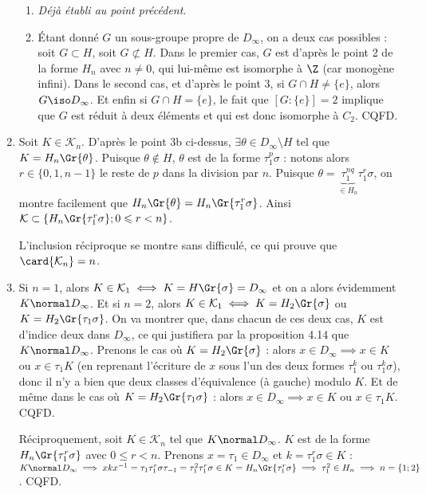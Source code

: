 \begin{enumerate}[1)]
\begin{enumerate}
    \item \emph{Déjà établi au point précédent}.
    \item Étant donné $G$ un sous-groupe propre de $D_{\infty}$, on a deux cas possibles : soit $G\subset H$, soit $G\not\subset H$. Dans le premier cas, $G$ est d'après le point 2 de la forme $H_n$ avec $n\neq 0$, qui lui-même est isomorphe à $\Z$ (car monogène infini).
    Dans le second cas, et d'après le point 3, si $G\cap H \neq \{e\}$, alors $G \iso D_{\infty}$. Et enfin si $G\cap H =\{e\}$, le fait que $[G:\{e\}] = 2$ implique que $G$ est réduit à deux éléments et qui est donc isomorphe à $C_2$. CQFD.
\end{enumerate}
\item Soit $K\in \mathcal{K}_n$. D'après le point 3b ci-dessus, $\exists \theta \in D_{\infty}\setminus H$ tel que $K = H_n \Gr{\theta}$. Puisque $\theta \not\in H$, $\theta$ est de la forme $\tau_1^p \sigma$ :
 notons alors $r\in \{0,1,n-1\}$ le reste de $p$ dans la division par $n$. Puisque $\theta = \underbrace{\tau_1^{nq}}_{\in H_n} \tau_1^r \sigma$, on montre facilement que $H_n \Gr{\theta} = H_n \Gr{\tau_1^r \sigma}$. Ainsi 
 $\mathcal{K}\subset \left\{H_n \Gr{\tau_1^r \sigma}; 0\leqslant r< n \right\}$.

 L'inclusion réciproque se montre sans difficulé, ce qui prouve que $\card{\mathcal{K}_n} = n$. 

\item Si $n=1$, alors $K\in \mathcal{K}_1\iff K = H\Gr{\sigma} = D_{\infty}$ et on a alors évidemment $K\normal D_{\infty}$. Et si $n=2$, alors $K\in \mathcal{K}_1\iff K = H_2\Gr{\sigma}$ ou 
$K = H_2\Gr{\tau_1 \sigma}$. On va montrer que, dans chacun de ces deux cas, $K$ est d'indice deux dans $D_{\infty}$, ce qui justifiera par la proposition 4.14 que $K\normal D_{\infty}$. 
Prenons le cas où $K = H_2\Gr{\sigma}$ : alors $x\in D_{\infty} \implies x\in K$ ou $x\in \tau_1 K$ (en reprenant l'écriture de $x$ sous l'un des deux formes $\tau_1^k$ ou $\tau_1^k\sigma$), donc il n'y a bien que deux classes d'équivalence (à gauche) modulo $K$. Et de même 
dans le cas où $K = H_2\Gr{\tau_1 \sigma}$ : alors $x\in D_{\infty} \implies x\in K$ ou $x\in \tau_1 K$. CQFD.

Réciproquement, soit $K\in \mathcal{K}_n$ tel que $K\normal D_{\infty}$. $K$ est de la forme $H_n\Gr{\tau_1^r \sigma}$ avec $0\leqslant r< n$. Prenons $x=\tau_1 \in D_{\infty}$ et $k = \tau_1^r \sigma \in K$ : $K\normal D_{\infty} \implies 
xkx^{-1} = \tau_1 \tau_1^r \sigma \tau_{-1}  = \tau_1^{2} \tau_1^r\sigma \in K = H_n\Gr{\tau_1^r \sigma} \implies \tau_1^2 \in H_n \implies n=\{1;2\}$. CQFD.\medskip



\end{enumerate}
